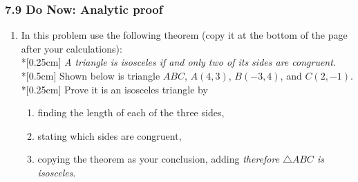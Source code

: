 \documentclass[12pt, twoside]{article}
\begin{document}
\subsubsection*{7.9 Do Now: Analytic proof}
  \begin{enumerate}
  \subsubsection*{Proof: Using the distance formula to prove an isosceles triangle}
    \item In this problem use the following theorem (copy it at the bottom of the page after your calculations): \\*[0.25cm]
    \emph{A triangle is isosceles if and only two of its sides are congruent.}\\*[0.5cm]
    Shown below is triangle $ABC$, $A(4,3)$, $B(-3,4)$, and $C(2,-1)$. \\*[0.25cm]
    Prove it is an isosceles triangle by
    \begin{enumerate}
      \item finding the length of each of the three sides,
      \item stating which sides are congruent,
      \item copying the theorem as your conclusion, adding \emph{therefore $\triangle ABC$ is isosceles}.
    \end{enumerate}
    \begin{flushright} %
    \end{flushright}

\newpage

\end{enumerate}
\end{document}
